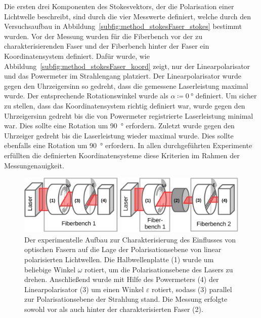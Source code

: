 \documentclass[a4paper,12pt,twoside,parskip=no,headsepline,open=right,ngerman,export]{scrreprt}
\begin{document}
            Die ersten drei Komponenten des Stokesvektors, der die Polarisation einer Lichtwelle beschreibt, sind durch die vier Messwerte definiert, welche durch den Versuchsaufbau in Abbildung~\ref{subfig:method_stokesFaser_stokes} bestimmt wurden. Vor der Messung wurden für die Fiberbench vor der zu charakterisierenden Faser  und der Fiberbench hinter der Faser  ein Koordinatensystem definiert. Dafür wurde, wie Abbildung~\ref{subfig:method_stokesFaser_koord} zeigt, nur der Linearpolarisator  und das Powermeter  im Strahlengang platziert. Der Linearpolarisator wurde gegen den Uhrzeigersinn so gedreht, dass die gemessene Laserleistung maximal wurde. Der entsprechende Rotationswinkel wurde als $\alpha \coloneqq \SI{0}{\degree}$ definiert. Um sicher zu stellen, dass das Koordinatensystem richtig definiert war, wurde  gegen den Uhrzeigersinn gedreht bis die von Powermeter registrierte Laserleistung minimal war. Dies sollte eine Rotation um \SI{90}{\degree} erfordern. Zuletzt wurde  gegen den Uhrzeiger gedreht bis die Laserleistung wieder maximal wurde. Dies sollte ebenfalls eine Rotation um \SI{90}{\degree} erfordern. In allen durchgeführten Experimente erfüllten die definierten Koordinatensysteme diese Kriterien im Rahmen der Messungenauigkeit.
  
            \begin{figure}[!b]
                \center
                \includegraphics[width=\textwidth]{img/aufbau_faser_rotation.pdf}
                \caption[Rotation der Polarisationsebene durch optische Fasern]{Der experimentelle Aufbau zur Charakterisierung des Einflusses von optischen Fasern auf die Lage der Polarisationsebene von linear polarisierten Lichtwellen. Die Halbwellenplatte (1) wurde um beliebige Winkel $\omega$ rotiert, um die Polarisationsebene des Lasers zu drehen. Anschließend wurde mit Hilfe des Powermeters (4) der Linearpolarisator (3) um einen Winkel $\varepsilon$ rotiert, sodass (3) parallel zur Polarisationsebene der Strahlung stand. Die Messung erfolgte sowohl vor als auch hinter der charakterisierten Faser (2).}
                \label{fig:method_rotationFaser}
            \end{figure}
            
\end{document}

